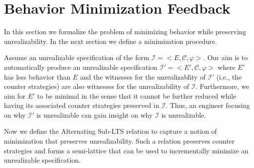 \section{Behavior Minimization Feedback}\label{sec:problemStatement}

In this section we formalize the problem of minimizing behavior while preserving unrealizability. In the next section we define a minimization procedure.

Assume an unrealizable specification of the form $\mathcal{I} = <E, \mathcal{C}, \varphi>$. Our aim is to automatically produce an unrealizable specification $\mathcal{I'} = <E', \mathcal{C}, \varphi>$ where $E'$ has less behavior than $E$ and the witnesses for the unrealizablity of $\mathcal{I'}$ (i.e., the counter strategies) are also witnesses for the unrealizability of $\mathcal{I}$.  Furthermore, we aim for $E'$ to be minimal in the sense that it cannot be further reduced while having its associated counter strategies preserved in  $\mathcal{I}$.
Thus, an engineer focusing on why  $\mathcal{I'}$ is unrealizable can gain insight on why $\mathcal{I}$ is unrealizable. 

%


Now we define the Alternating Sub-LTS relation to capture a notion of minimization that preserves unrealizability. Such a relation preserves counter strategies and forms a semi-lattice that can be used to incrementally minimize an unrealizable specification. 

%

